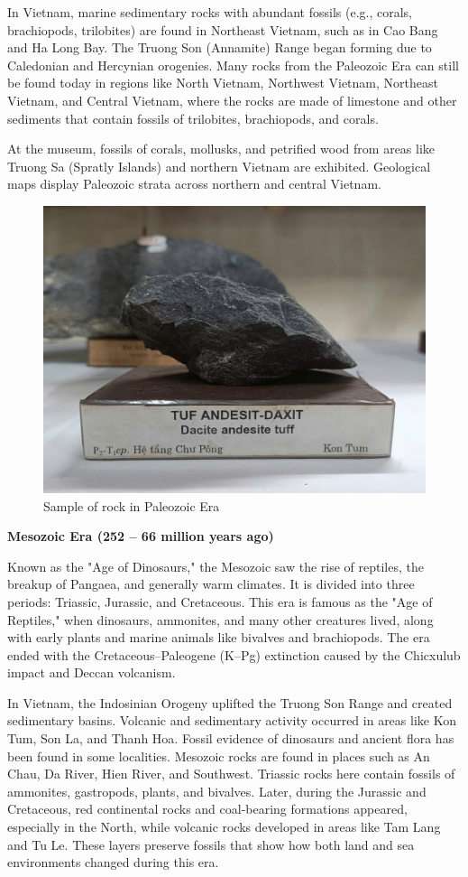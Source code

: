 In Vietnam, marine sedimentary rocks with abundant fossils (e.g., corals, brachiopods, trilobites) are found in Northeast Vietnam, such as in Cao Bang and Ha Long Bay. The Truong Son (Annamite) Range began forming due to Caledonian and Hercynian orogenies. Many rocks from the Paleozoic Era can still be found today in regions like North Vietnam, Northwest Vietnam, Northeast Vietnam, and Central Vietnam, where the rocks are made of limestone and other sediments that contain fossils of trilobites, brachiopods, and corals.

At the museum, fossils of corals, mollusks, and petrified wood from areas like Truong Sa (Spratly Islands) and northern Vietnam are exhibited. Geological maps display Paleozoic strata across northern and central Vietnam.

\begin{figure}[H]
  \centering
  \includegraphics[max width=0.8\linewidth]{graphics/figure_04.jpg}
  \caption{Sample of rock in Paleozoic Era}
  \label{fig:paleozoic-rock}
\end{figure}

\textbf{Mesozoic Era (252 – 66 million years ago)}

Known as the "Age of Dinosaurs," the Mesozoic saw the rise of reptiles, the breakup of Pangaea, and generally warm climates. It is divided into three periods: Triassic, Jurassic, and Cretaceous. This era is famous as the "Age of Reptiles," when dinosaurs, ammonites, and many other creatures lived, along with early plants and marine animals like bivalves and brachiopods. The era ended with the Cretaceous–Paleogene (K–Pg) extinction caused by the Chicxulub impact and Deccan volcanism.

In Vietnam, the Indosinian Orogeny uplifted the Truong Son Range and created sedimentary basins. Volcanic and sedimentary activity occurred in areas like Kon Tum, Son La, and Thanh Hoa. Fossil evidence of dinosaurs and ancient flora has been found in some localities. Mesozoic rocks are found in places such as An Chau, Da River, Hien River, and Southwest. Triassic rocks here contain fossils of ammonites, gastropods, plants, and bivalves. Later, during the Jurassic and Cretaceous, red continental rocks and coal-bearing formations appeared, especially in the North, while volcanic rocks developed in areas like Tam Lang and Tu Le. These layers preserve fossils that show how both land and sea environments changed during this era.

